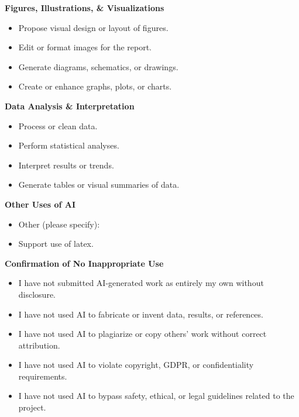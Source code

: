 \documentclass[11pt,a4paper]{article}
\begin{document}
\textbf{Figures, Illustrations, \& Visualizations}
\begin{itemize}
  \item[$\square$] Propose visual design or layout of figures.
  \item[$\square$] Edit or format images for the report.
  \item[$\square$] Generate diagrams, schematics, or drawings.
  \item[$\blacksquare$] Create or enhance graphs, plots, or charts.
\end{itemize}

\textbf{Data Analysis \& Interpretation}
\begin{itemize}
  \item[$\square$] Process or clean data.
  \item[$\blacksquare$] Perform statistical analyses.
  \item[$\blacksquare$] Interpret results or trends.
  \item[$\blacksquare$] Generate tables or visual summaries of data.
\end{itemize}

\textbf{Other Uses of AI}
\begin{itemize}
  \item[$\square$] Other (please specify):
  \item[$\blacksquare$] Support use of latex.
\end{itemize}

\textbf{Confirmation of No Inappropriate Use}
\begin{itemize}
  \item[$\blacksquare$] I have not submitted AI-generated work as entirely my own without disclosure.
  \item[$\blacksquare$] I have not used AI to fabricate or invent data, results, or references.
  \item[$\blacksquare$] I have not used AI to plagiarize or copy others' work without correct attribution.
  \item[$\blacksquare$] I have not used AI to violate copyright, GDPR, or confidentiality requirements.
  \item[$\blacksquare$] I have not used AI to bypass safety, ethical, or legal guidelines related to the project.
\end{itemize}

\normalsize
\end{document}
